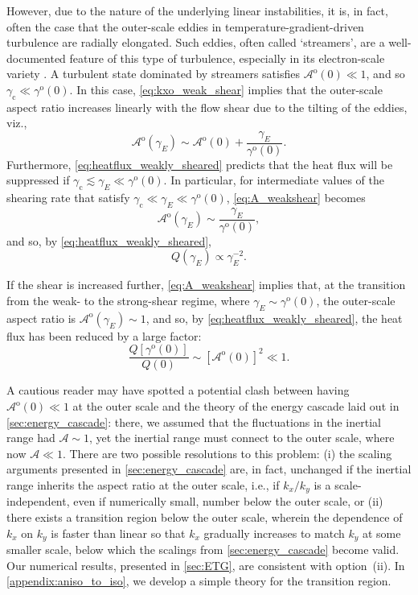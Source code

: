 \documentclass{jpp}
\newcommand{\gammaoO}{\gamma^\text{o}(0)}
\newcommand{\gammaani}{\gamma_{\text{c}}}
\newcommand{\gammaE}{\gamma_{E}}
\newcommand{\A}{\mathcal{A}}
\newcommand{\Ao}{\A^\text{o}}
\newcommand{\AoO}{\A^\text{o}(0)}
\begin{document}
However, due to the nature of the underlying linear instabilities, it is, in fact, often the case that the outer-scale eddies in temperature-gradient-driven turbulence are radially elongated. Such eddies, often called `streamers', are a well-documented feature of this type of turbulence, especially in its electron-scale variety \citep{drake88, jenko00, dorland00, jenko06, roach09, colyer17}. A turbulent state dominated by streamers satisfies \(\AoO \ll 1\), and so \(\gammaani \ll \gammaoO\). In this case, \cref{eq:kxo_weak_shear} implies that the outer-scale aspect ratio increases linearly with the flow shear due to the tilting of the eddies, viz.,
\begin{equation}
	\Ao(\gammaE) \sim \AoO + \frac{\gammaE}{\gammaoO}.
	\label{eq:A_weakshear}
\end{equation}
Furthermore, \cref{eq:heatflux_weakly_sheared} predicts that the heat flux will be suppressed if \(\gammaani \lesssim \gammaE \ll \gammaoO\). In particular, for intermediate values of the shearing rate that satisfy \(\gammaani \ll \gammaE \ll \gammaoO\), \cref{eq:A_weakshear} becomes 
\begin{equation}
	\Ao(\gammaE) \sim \frac{\gammaE}{\gammaoO},
	\label{eq:A_weakshear_intermediate}
\end{equation}
and so, by \cref{eq:heatflux_weakly_sheared},
\begin{equation}
	Q(\gammaE) \propto \gammaE^{-2}.
	\label{eq:intermediate_shear_heat_flux}
\end{equation}

If the shear is increased further, \cref{eq:A_weakshear} implies that, at the transition from the weak- to the strong-shear regime, where \mbox{\(\gammaE \sim \gammaoO\)}, the outer-scale aspect ratio is \(\Ao(\gammaE) \sim 1\), and so, by \cref{eq:heatflux_weakly_sheared}, the heat flux has been reduced by a large factor:
\begin{equation}
	\frac{Q[\gammaoO]}{Q(0)} \sim \left[\AoO\right]^2 \ll 1.
\end{equation}

A cautious reader may have spotted a potential clash between having \(\AoO \ll 1\) at the outer scale and the theory of the energy cascade laid out in \cref{sec:energy_cascade}: there, we assumed that the fluctuations in the inertial range had \(\A \sim 1\), yet the inertial range must connect to the outer scale, where now \(\A \ll 1\). There are two possible resolutions to this problem: (i) the scaling arguments presented in \cref{sec:energy_cascade} are, in fact, unchanged if the inertial range inherits the aspect ratio at the outer scale, i.e., if \(k_x/k_y\) is a scale-independent, even if numerically small, number below the outer scale, or (ii) there exists a transition region below the outer scale, wherein the dependence of \(k_x\) on \(k_y\) is faster than linear so that \(k_x\) gradually increases to match \(k_y\) at some smaller scale, below which the scalings from \cref{sec:energy_cascade} become valid. Our numerical results, presented in \cref{sec:ETG}, are consistent with option~(ii). In \cref{appendix:aniso_to_iso}, we develop a simple theory for the transition region.
\end{document}
